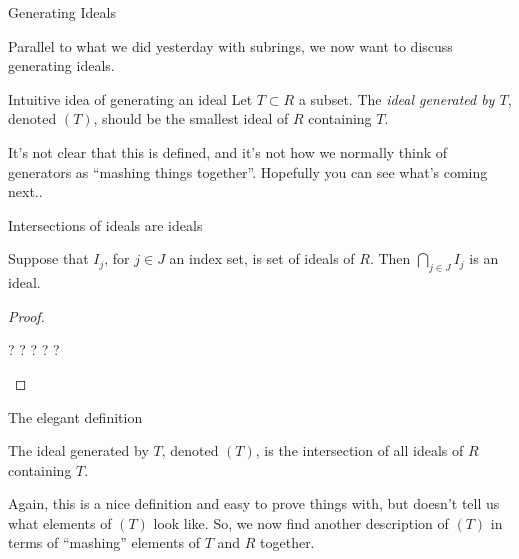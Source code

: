 \documentclass{beamer}
\begin{document}
\begin{frame}{Generating Ideals}

Parallel to what we did yesterday with subrings, we now want to discuss generating ideals.

\begin{block}{Intuitive idea of generating an ideal}
Let $T\subset R$ a subset.  The \emph{ideal generated by $T$}, denoted $(T)$, should be the smallest ideal of $R$ containing $T$.
\end{block}

It's not clear that this is defined, and it's not how we normally think of generators as ``mashing things together''.  Hopefully you can see what's coming next..
\end{frame}

\begin{frame}{Intersections of ideals are ideals}
\begin{lemma} Suppose that $I_j$, for $j\in J$ an index set, is set of ideals of $R$.  Then $\bigcap_{j\in J} I_j$ is an ideal.
\end{lemma}

\begin{proof} 
 \begin{center} ? ? ? ? ? \end{center}
\end{proof}


\end{frame}


\begin{frame}{The elegant definition}

\begin{definition}
The ideal generated by $T$, denoted $(T)$, is the intersection of all ideals of $R$ containing $T$.
\end{definition}

Again, this is a nice definition and easy to prove things with, but doesn't tell us what elements of $(T)$ look like.  So, we now find another description of $(T)$ in terms of ``mashing'' elements of $T$ and $R$ together.

\end{frame}
\end{document}
